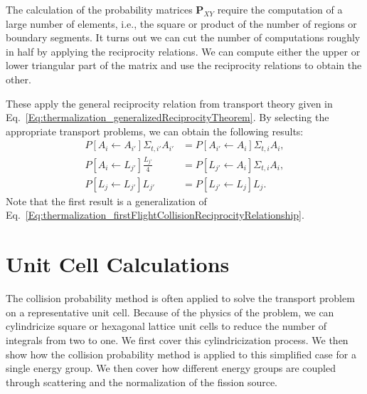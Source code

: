 The calculation of the probability matrices $\mathbf{P}_{XY}$ require the computation of a large number of elements, i.e., the square or product of the number of regions or boundary segments. It turns out we can cut the number of computations roughly in half by applying the reciprocity relations. We can compute either the upper or lower triangular part of the matrix and use the reciprocity relations to obtain the other.

These apply the general reciprocity relation from transport theory given in Eq.~\eqref{Eq:thermalization_generalizedReciprocityTheorem}. By selecting the appropriate transport problems, we can obtain the following results:
\begin{subequations}
\begin{align}
  P[ A_i \leftarrow A_{i'} ] \Sigma_{t,i'} A_{i'} &= P[ A_{i'} \leftarrow A_{i} ] \Sigma_{t,i} A_{i} , \label{Eq:transport_reciprocityRelation_region_region} \\
  P[ A_i \leftarrow L_{j'} ] \frac{L_{j'}}{4} &= P[ L_{j'} \leftarrow A_{i} ] \Sigma_{t,i} A_{i} , \label{Eq:transport_reciprocityRelation_region_segment}  \\
  P[ L_j \leftarrow L_{j'} ] L_{j'} &= P[ L_{j'} \leftarrow L_{j} ] L_j .  \label{Eq:transport_reciprocityRelation_segment_segment}
\end{align}
\end{subequations}
Note that the first result is a generalization of Eq.~\eqref{Eq:thermalization_firstFlightCollisionReciprocityRelationship}.





\section{Unit Cell Calculations}

The collision probability method is often applied to solve the transport problem on a representative unit cell. Because of the physics of the problem, we can cylindricize square or hexagonal lattice unit cells to reduce the number of integrals from two to one. We first cover this cylindricization process. We then show how the collision probability method
is applied to this simplified case for a single energy group. We then cover how different energy groups are coupled through scattering and the normalization of the fission source.





